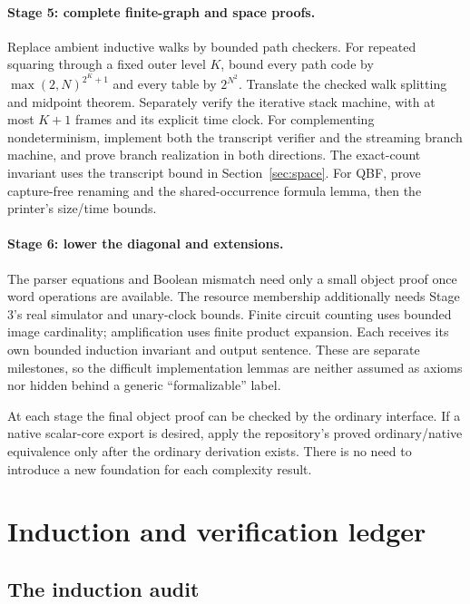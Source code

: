 \paragraph{Stage 5: complete finite-graph and space proofs.}
Replace ambient inductive walks by bounded path checkers. For repeated
squaring through a fixed outer level \(K\), bound every path code by
\(\max(2,N)^{2^K+1}\) and every table by \(2^{N^2}\). Translate the
checked walk splitting and midpoint theorem. Separately verify the
iterative stack machine, with at most \(K+1\) frames and its explicit
time clock. For complementing nondeterminism, implement both the transcript
verifier and the streaming branch machine, and prove branch realization in
both directions. The exact-count invariant uses the transcript bound in
Section~\ref{sec:space}. For QBF, prove capture-free renaming and the
shared-occurrence formula lemma, then the printer's size/time bounds.

\paragraph{Stage 6: lower the diagonal and extensions.}
The parser equations and Boolean mismatch need only a small object proof
once word operations are available. The resource membership additionally
needs Stage 3's real simulator and unary-clock bounds. Finite circuit
counting uses bounded image cardinality; amplification uses finite product
expansion. Each receives its own bounded induction invariant and output
sentence. These are separate milestones, so the difficult implementation
lemmas are neither assumed as axioms nor hidden behind a generic
``formalizable'' label.

At each stage the final object proof can be checked by the ordinary
 interface. If a native scalar-core export is desired,
apply the repository's proved ordinary/native equivalence only after the
ordinary derivation exists. There is no need to introduce a new foundation
for each complexity result.

\section{Induction and verification ledger}
\label{sec:ledger}

\subsection{The induction audit}

